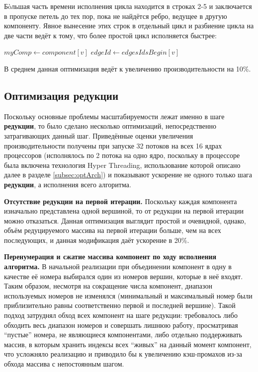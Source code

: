\documentclass[a4paper,10pt]{extarticle}
\begin{document}
Б\`oльшая часть времени исполнения цикла находится в строках 2-5 и заключается в пропуске петель до тех пор, пока не найдётся ребро, ведущее в другую компоненту. Явное вынесение этих строк в отдельный цикл и разбиение цикла на две части ведёт к тому, что более простой цикл исполняется быстрее:

\begin{algorithm}[H]
    \SetAlgoLined
    $myComp \gets component[v]$\;
    $edgeId \gets edgesIdsBegin[v]$\;
\end{algorithm}


В среднем данная оптимизация ведёт к увеличению производительности на 10\%.


\subsection{Оптимизация редукции}
\label{subsec:optReduction}

Поскольку основные проблемы масштабируемости лежат именно в шаге \textbf{редукции}, то было сделано несколько оптимизаций, непосредственно затрагивающих данный шаг. 
Приведённые оценки увеличения производительности получены при запуске 32 потоков на всех 16 ядрах процессоров (исполнялось по 2 потока на одно ядро, поскольку в процессоре была включена технология Hyper Threading, использование которой описано далее в разделе \ref{subsec:optArch})
и показывают ускорение не одного только шага \textbf{редукции}, а исполнения всего алгоритма.

\textbf{Отсутствие редукции на первой итерации.}
Поскольку каждая компонента изначально представлена одной вершиной, то от редукции на первой итерации можно отказаться. Данная оптимизация выглядит простой и очевидной, однако, объём редуцируемого массива на первой итерации больше, чем на всех последующих, и данная модификация даёт ускорение в 20\%.

\textbf{Перенумерация и сжатие массива компонент по ходу исполнения алгоритма.}
В начальной реализации при объединении компонент в одну в качестве её номера выбирался один из номеров вершин, которые в неё входят. Таким образом, несмотря на сокращение числа компонент, диапазон используемых номеров не изменялся (минимальный и максимальный номер были приблизительно равны соответственно первой и последней вершине). Такой подход затруднял обход всех компонент на шаге редукции: требовалось либо обходить весь диапазон номеров и совершать лишнюю работу, просматривая ``пустые'' номера, не являющиеся компонентами, либо отдельно поддерживать массив, в которым хранить индексы всех ``живых'' на данный момент компонент, что усложняло реализацию и приводило бы к увеличению кэш-промахов из-за обхода массива с непостоянным шагом.
\end{document}
